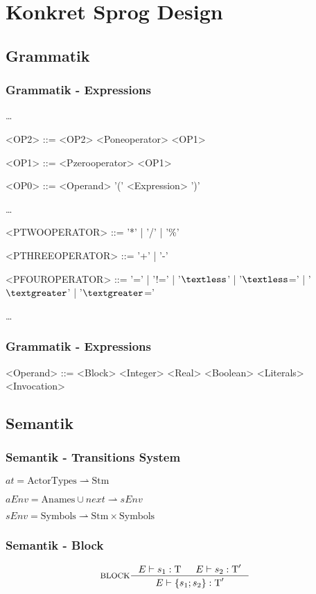 \section{Konkret Sprog Design}
\subsection{Grammatik}
\begin{frame}
	\frametitle{Grammatik - Expressions}
	\dots
	\begin{grammar}
	<OP2> ::= <OP2> <Poneoperator> <OP1>
  
	<OP1> ::= <Pzerooperator> <OP1>

  <OP0> ::= <Operand>
  \alt '(' <Expression> ')'
  \end{grammar}
	\dots
	\begin{grammar}
	<PTWOOPERATOR> ::= '*' | '/' | '\%'
	
	<PTHREEOPERATOR> ::= '+' | '-'
	
	<PFOUROPERATOR> ::= '=' | '!=' | '$\textless$' | '$\textless$=' | '$\textgreater$' | '$\textgreater$='
	\end{grammar}
	\dots
\end{frame}

\begin{frame}
	\frametitle{Grammatik - Expressions}
	\begin{grammar}
  <Operand> ::= <Block>
    \alt <Integer>
    \alt <Real>
    \alt <Boolean>
    \alt <Literals>
    \alt <Invocation>
  \end{grammar}
\end{frame}

\subsection{Semantik}
\begin{frame}
	\frametitle{Semantik - Transitions System}
	\begin{center}	
  $at = \text{ActorTypes} \rightharpoonup \text{Stm}$
	
	$aEnv = \text{Anames} \cup {next} \rightharpoonup sEnv$
	
	$sEnv = \text{Symbols} \rightharpoonup \text{Stm} \times \text{Symbols}$
  \end{center}
\end{frame}

\begin{frame}
	\frametitle{Semantik - Block}
	\begin{align*}
  &\inference[BLOCK]{\Tenv s_1: \Tt & \Tenv s_2: \Tt'}
                    {\Tenv \{s_1; s_2\} : \Tt'}
  \end{align*}
\end{frame}

